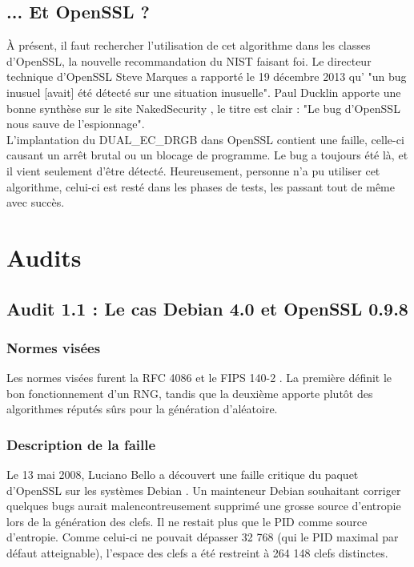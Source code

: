 	\subsection{... Et OpenSSL ?}
	
	À présent, il faut rechercher l'utilisation de cet algorithme dans les classes d'OpenSSL, la nouvelle recommandation du NIST faisant foi. Le directeur technique d'OpenSSL Steve Marques a rapporté le 19 décembre 2013 qu' "un bug inusuel [avait] été détecté sur une situation inusuelle". Paul Ducklin apporte une bonne synthèse sur le site NakedSecurity \cite{duckin2013openssl}, le titre est clair : "Le bug d'OpenSSL nous sauve de l'espionnage".\\
	
	
	L'implantation du DUAL\_EC\_DRGB dans OpenSSL contient une faille, celle-ci causant un arrêt brutal ou un blocage de programme. Le bug a toujours été là, et il vient seulement d'être détecté. Heureusement, personne n'a pu utiliser cet algorithme, celui-ci est resté dans les phases de tests, les passant tout de même avec succès.\\

\section{Audits}
	\subsection{Audit 1.1 : Le cas Debian 4.0 et OpenSSL 0.9.8}
		\subsubsection{Normes visées}
			Les normes visées furent la RFC 4086 \cite{rfc4086} et le FIPS 140-2 \cite{fips140-2}. La première définit le bon fonctionnement d'un RNG, tandis que la deuxième apporte plutôt des algorithmes réputés sûrs pour la génération d'aléatoire.
		
		\subsubsection{Description de la faille}
			Le 13 mai 2008, Luciano Bello a découvert une faille critique du paquet d'OpenSSL sur les systèmes Debian \cite{faille2008linux.org}. Un mainteneur Debian souhaitant corriger quelques bugs aurait malencontreusement supprimé une grosse source d'entropie lors de la génération des clefs. Il ne restait plus que le PID comme source d'entropie. Comme celui-ci ne pouvait dépasser 32 768 (qui le PID maximal par défaut atteignable), l'espace des clefs a été restreint à 264 148 clefs distinctes.\\
		
